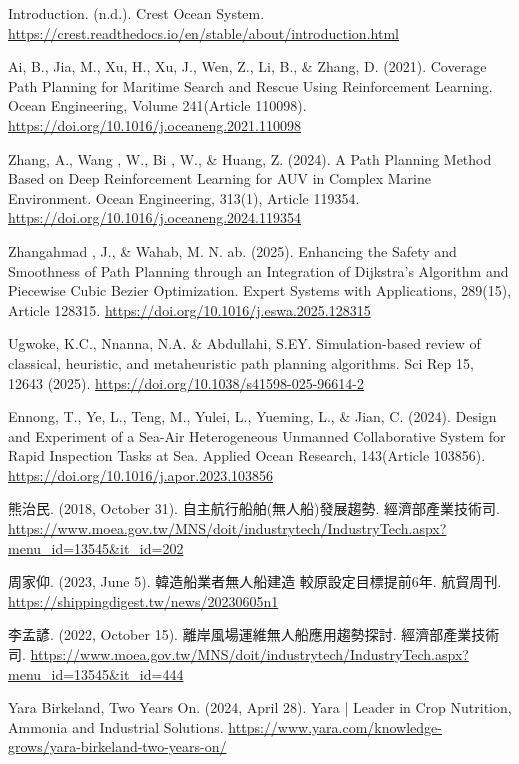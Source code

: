 \documentclass[12pt,a4paper]{article}
\begin{document}
\begin{thebibliography}{9}
Introduction. 
(n.d.). 
Crest Ocean System. 
\url{https://crest.readthedocs.io/en/stable/about/introduction.html}

Ai, B., Jia, M., Xu, H., Xu, J., Wen, Z., Li, B., \& Zhang, D. 
(2021). 
Coverage Path Planning for Maritime Search and Rescue Using Reinforcement Learning. 
Ocean Engineering, Volume 241(Article 110098).
\url{https://doi.org/10.1016/j.oceaneng.2021.110098}

Zhang, A., Wang , W., Bi , W., \& Huang, Z. 
(2024). 
A Path Planning Method Based on Deep Reinforcement Learning for AUV in Complex Marine Environment. Ocean Engineering, 313(1), Article 119354. 
\url{https://doi.org/10.1016/j.oceaneng.2024.119354}

Zhangahmad , J., \& Wahab, M. N. ab. 
(2025). 
Enhancing the Safety and Smoothness of Path Planning through an Integration of Dijkstra’s Algorithm and Piecewise Cubic Bezier Optimization. Expert Systems with Applications, 289(15), Article 128315. 
\url{https://doi.org/10.1016/j.eswa.2025.128315}

Ugwoke, K.C., Nnanna, N.A. \& Abdullahi, S.EY. 
Simulation-based review of classical, heuristic, and metaheuristic path planning algorithms. Sci Rep 15, 12643 (2025). 
\url{https://doi.org/10.1038/s41598-025-96614-2}

Ennong, T., Ye, L., Teng, M., Yulei, L., Yueming, L., \& Jian, C. 
(2024). 
Design and Experiment of a Sea-Air Heterogeneous Unmanned Collaborative System for Rapid Inspection Tasks at Sea. 
Applied Ocean Research, 143(Article 103856). 
\url{https://doi.org/10.1016/j.apor.2023.103856}

熊治民. 
(2018, October 31). 
自主航行船舶(無人船)發展趨勢. 經濟部產業技術司. 
\url{https://www.moea.gov.tw/MNS/doit/industrytech/IndustryTech.aspx?menu_id=13545&it_id=202}

周家仰. 
(2023, June 5). 
韓造船業者無人船建造 較原設定目標提前6年. 航貿周刊. 
\url{https://shippingdigest.tw/news/20230605n1}

李孟諺. 
(2022, October 15). 
離岸風場運維無人船應用趨勢探討. 經濟部產業技術司. 
\url{https://www.moea.gov.tw/MNS/doit/industrytech/IndustryTech.aspx?menu_id=13545&it_id=444}

Yara Birkeland, Two Years On. 
(2024, April 28). 
Yara | Leader in Crop Nutrition, Ammonia and Industrial Solutions. 
\url{https://www.yara.com/knowledge-grows/yara-birkeland-two-years-on/}


\end{thebibliography}
\end{document}
